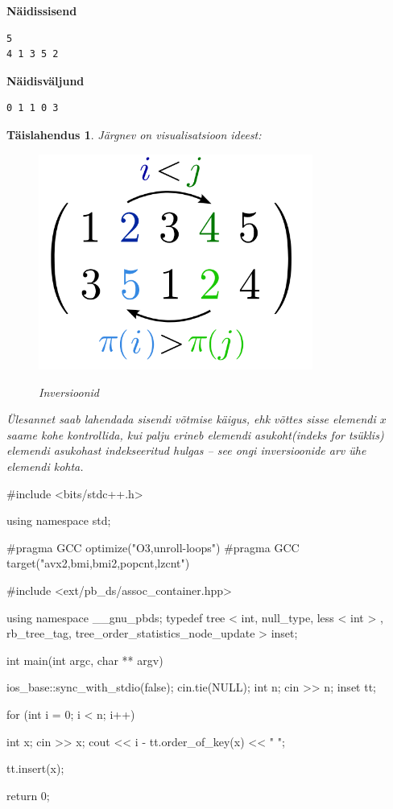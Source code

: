 \documentclass{trkut}
\newtheorem*{solution}{Täislahendus}
\begin{document}
\textbf{Näidissisend}

\begin{verbatim}
5
4 1 3 5 2
\end{verbatim}

\textbf{Näidisväljund}

\begin{verbatim}
0 1 1 0 3 
\end{verbatim}


\begin{solution}
Järgnev on visualisatsioon ideest:
\begin{figure}[H]%
    \includegraphics[width=9cm]{inverso.png}%
    \caption{Inversioonid}%
    \label{graaf}%
    \end{figure}
Ülesannet saab lahendada sisendi võtmise käigus, ehk võttes sisse elemendi $x$ saame kohe kontrollida, kui palju erineb elemendi asukoht(indeks for tsüklis) elemendi asukohast indekseeritud hulgas -- see ongi inversioonide arv ühe elemendi kohta.
\end{solution}
\begin{cclol}
#include <bits/stdc++.h>

using namespace std;

#pragma GCC optimize("O3,unroll-loops")
#pragma GCC target("avx2,bmi,bmi2,popcnt,lzcnt")

#include <ext/pb_ds/assoc_container.hpp>

using namespace __gnu_pbds;
typedef tree < int, null_type, less < int > , rb_tree_tag, 
tree_order_statistics_node_update > inset;

int main(int argc, char ** argv) {
  ios_base::sync_with_stdio(false);
  cin.tie(NULL);
  int n;
  cin >> n;
  inset tt;

  for (int i = 0; i < n; i++) {
    int x;
    cin >> x;
    cout << i - tt.order_of_key(x) << " ";

    tt.insert(x);
  }

  return 0;
}
    \end{cclol}
    \begin{kk}[H]
    \caption{Codeforces, Inversions}%
    \end{kk}
\end{document}
